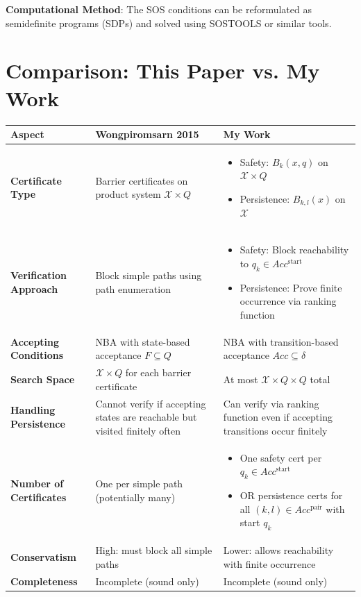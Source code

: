 \documentclass{article}
\begin{document}
\textbf{Computational Method}: The SOS conditions can be reformulated as semidefinite programs (SDPs) and solved using SOSTOOLS or similar tools.

\section{Comparison: This Paper vs. My Work}

\begin{center}
\begin{tabular}{|p{4cm}|p{5cm}|p{5cm}|}
\hline
\textbf{Aspect} & \textbf{Wongpiromsarn 2015} & \textbf{My Work} \\
\hline
\textbf{Certificate Type} & Barrier certificates on product system $\mathcal{X} \times Q$ &
\begin{itemize}
\item Safety: $B_k(x,q)$ on $\mathcal{X} \times Q$
\item Persistence: $B_{k,l}(x)$ on $\mathcal{X}$
\end{itemize} \\
\hline
\textbf{Verification Approach} & Block simple paths using path enumeration &
\begin{itemize}
\item Safety: Block reachability to $q_k \in Acc^{\text{start}}$
\item Persistence: Prove finite occurrence via ranking function
\end{itemize} \\
\hline
\textbf{Accepting Conditions} & NBA with state-based acceptance $F \subseteq Q$ & NBA with transition-based acceptance $Acc \subseteq \delta$ \\
\hline
\textbf{Search Space} & $\mathcal{X} \times Q$ for each barrier certificate & At most $\mathcal{X} \times Q \times Q$ total \\
\hline
\textbf{Handling Persistence} & Cannot verify if accepting states are reachable but visited finitely often & Can verify via ranking function even if accepting transitions occur finitely \\
\hline
\textbf{Number of Certificates} & One per simple path (potentially many) &
\begin{itemize}
\item One safety cert per $q_k \in Acc^{\text{start}}$
\item OR persistence certs for all $(k,l) \in Acc^{\text{pair}}$ with start $q_k$
\end{itemize} \\
\hline
\textbf{Conservatism} & High: must block all simple paths & Lower: allows reachability with finite occurrence \\
\hline
\textbf{Completeness} & Incomplete (sound only) & Incomplete (sound only) \\
\hline
\end{tabular}
\end{center}
\end{document}
